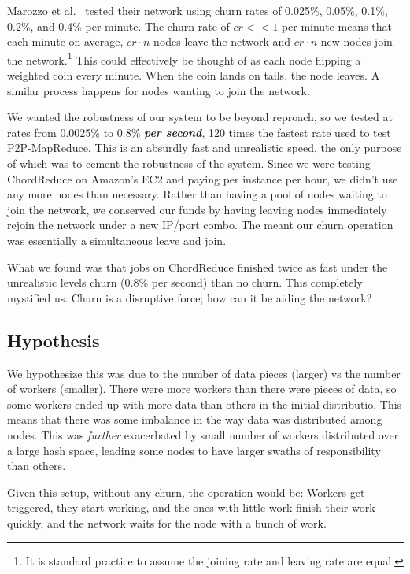 Marozzo et al.\ \cite{marozzo2012p2p} tested their network using churn rates of 0.025\%, 0.05\%, 0.1\%, 0.2\%, and 0.4\% per minute.
The churn rate of $cr << 1$ per minute means that each minute on average, $cr \cdot n$ nodes leave the network and $cr \cdot n$  new nodes join the network.\footnote{It is standard practice to assume the joining rate and leaving rate are equal.}
This could effectively be thought of as each node flipping a weighted coin every minute.
When the coin lands on tails, the node leaves.
A similar process happens for nodes wanting to join the network.

We wanted the robustness of our system to be beyond reproach, so we tested at rates from 0.0025\% to 0.8\% \textbf{\textit{per second}}, 120 times the fastest rate used to test P2P-MapReduce.
This is an absurdly fast and unrealistic speed, the only purpose of which was to cement the robustness of the system.
Since we were testing ChordReduce on Amazon's EC2 and paying per instance per hour, we didn't use any more nodes than necessary.
Rather than having a pool of nodes waiting to join the network, we conserved our funds by having leaving nodes immediately rejoin the network under a new IP/port combo.
The meant our churn operation was essentially a simultaneous leave and join.


What we found was that jobs on ChordReduce finished twice as fast under the unrealistic levels churn (0.8\% per second) than no churn.
This completely mystified us. 
Churn is a disruptive force; how can it be aiding the network?

\subsection{Hypothesis}
We hypothesize this was due to the number of data pieces (larger) vs the number of workers (smaller).
There were more workers than there were pieces of data, so some workers ended up with more data than others in the initial distributio.
This means that there was some imbalance in the way data was distributed among nodes.
This was \textit{further} exacerbated by small number of workers distributed over a large hash space, leading some nodes to have larger swaths of responsibility than others.

Given this setup, without any churn, the operation would be:
Workers get triggered, they start working, and the ones with little work finish their work quickly, and the network waits for the node with a bunch of work.

